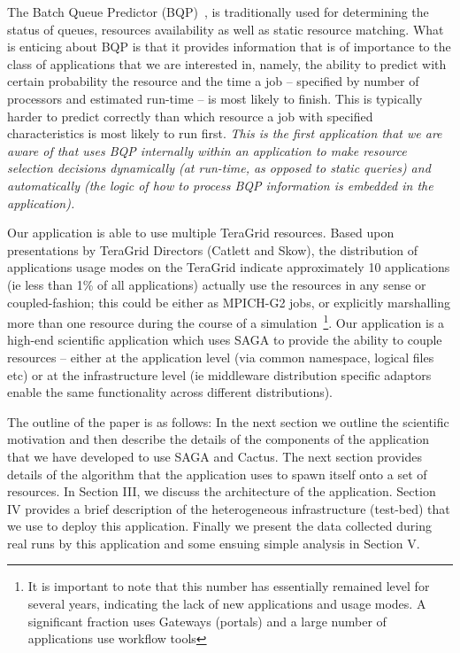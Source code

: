 \documentclass[conference,final]{IEEEtran}
\begin{document}
 The Batch
Queue Predictor (BQP)~\cite{bqp, bqp_url}, is traditionally used for
determining the status of queues, resources availability as well as
static resource matching. What is enticing about BQP is that it
provides information that is of importance to the class of
applications that we are interested in, namely, the ability to predict
with certain probability the resource and the time a job -- specified
by number of processors and estimated run-time -- is most likely to
finish.  This is typically harder to predict correctly than which
resource a job with specified characteristics is most likely to run
first.  {\it This is the first application that we are aware of that
  uses BQP internally within an application to make resource selection
  decisions dynamically (at run-time, as opposed to static queries)
  and automatically (the logic of how to process BQP information is
  embedded in the application).}

 Our application is able to use multiple TeraGrid
resources.  Based upon presentations by TeraGrid Directors (Catlett
and Skow), the distribution of applications usage modes on the
TeraGrid indicate approximately 10 applications (ie less than 1\% of
all applications) actually use the resources in any sense or
coupled-fashion; this could be either as MPICH-G2 jobs, or explicitly
marshalling more than one resource during the course of a
simulation~\footnote{It is important to note that this number has
  essentially remained level for several years, indicating the lack of
  new applications and usage modes. A significant fraction uses
  Gateways (portals) and a large number of applications use workflow
  tools}. Our application is a high-end scientific application which
uses SAGA to provide the ability to couple resources -- either at the
application level (via common namespace, logical files etc) or at the
infrastructure level (ie middleware distribution specific adaptors
enable the same functionality across different distributions).

The outline of the paper is as follows: In the next section we outline
the scientific motivation and then describe the details of the
components of the application that we have developed to use SAGA and
Cactus.  The next section provides details of the algorithm that the
application uses to spawn itself onto a set of resources.  In Section
III, we discuss the architecture of the application. Section IV
provides a brief description of the heterogeneous infrastructure
(test-bed) that we use to deploy this application. Finally we present
the data collected during real runs by this application and some
ensuing simple analysis in Section V.
\end{document}
